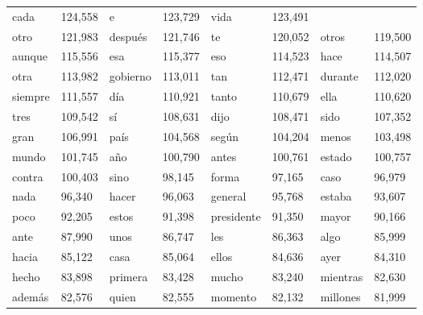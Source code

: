\begin{table}
\begin{tabular}{|l|l|l|l|l|l|l|l|}
    	cada 	 &  124,558	   &
    	e	  & 123,729	   & 
    	vida	&   123,491	 \\
    	otro	 &  121,983	  & 
    	despu\'es & 	  121,746	  &
    	te	 &  120,052	 & 
    	otros	&   119,500	  \\
    	aunque 	&   115,556	   & 
    	esa 	&   115,377	   &
        eso 	&   114,523	   &
    	hace & 	  114,507	 \\
    	otra & 	  113,982	   & 
    	gobierno	&   113,011	 &
    	tan	 &  112,471	   & 
    	durante	&   112,020	   \\
    	siempre & 	  111,557	  & 
    	d\'ia	&   110,921	   &
    	tanto	&   110,679	   & 
    	ella	&   110,620\\
    	tres	&   109,542	  & 
    	s\'i	&   108,631	   &
    	dijo	&   108,471	  & 
    	sido	&   107,352	   \\
    	gran	&   106,991	   & 
    	pa\'is	&   104,568	 & 
    	seg\'un & 	  104,204	& 
   	    menos  	&   103,498	 \\
 
 	mundo &   101,745	   &
   	a\~no &	  100,790	&
   	antes 	&  100,761	   &
   	estado 	&  100,757	   \\
   	contra	&  100,403	  &
   	sino	 &  98,145	&
   	forma	 &  97,165	   &
   	caso 	 &  96,979	  \\
   	nada 	 &  96,340	   &
   	hacer	 &  96,063	   &
   	general	 &  95,768	   &
   	estaba 	 &  93,607	\\
   	poco 	 &  92,205	  &
   	estos	 &  91,398 &
   	presidente	&   91,350	  &
   	mayor 	  & 90,166	   \\
   	ante	&   87,990	   &
   	unos 	&   86,747	 &
   	les	  & 86,363	   &
   	algo	&   85,999	 \\
   	hacia	&   85,122	   &
   	casa 	&   85,064	 &
   	ellos	&   84,636	 &
   	ayer	&   84,310	  \\
   	hecho 	&   83,898	  &
   	primera	&   83,428	&
   	mucho  	&   83,240	  &
   	mientras	&   82,630	   \\
   	adem\'as  	&   82,576 &
   	quien	  & 82,555 &
   	momento  &	   82,132	&
   	millones &	   81,999 \\
   

\end{tabular}
\end{table}
